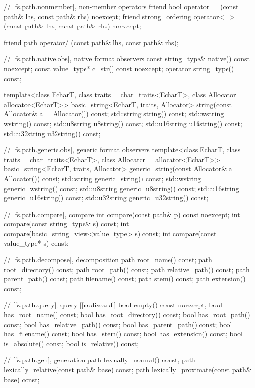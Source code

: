 \begin{codeblock}
{{    // \ref{fs.path.nonmember}, non-member operators
    friend bool operator==(const path& lhs, const path& rhs) noexcept;
    friend strong_ordering operator<=>(const path& lhs, const path& rhs) noexcept;

    friend path operator/ (const path& lhs, const path& rhs);

    // \ref{fs.path.native.obs}, native format observers
    const string_type& native() const noexcept;
    const value_type*  c_str() const noexcept;
    operator string_type() const;

    template<class EcharT, class traits = char_traits<EcharT>,
             class Allocator = allocator<EcharT>>
      basic_string<EcharT, traits, Allocator>
        string(const Allocator& a = Allocator()) const;
    std::string    string() const;
    std::wstring   wstring() const;
    std::u8string  u8string() const;
    std::u16string u16string() const;
    std::u32string u32string() const;

    // \ref{fs.path.generic.obs}, generic format observers
    template<class EcharT, class traits = char_traits<EcharT>,
             class Allocator = allocator<EcharT>>
      basic_string<EcharT, traits, Allocator>
        generic_string(const Allocator& a = Allocator()) const;
    std::string    generic_string() const;
    std::wstring   generic_wstring() const;
    std::u8string  generic_u8string() const;
    std::u16string generic_u16string() const;
    std::u32string generic_u32string() const;

    // \ref{fs.path.compare}, compare
    int compare(const path& p) const noexcept;
    int compare(const string_type& s) const;
    int compare(basic_string_view<value_type> s) const;
    int compare(const value_type* s) const;

    // \ref{fs.path.decompose}, decomposition
    path root_name() const;
    path root_directory() const;
    path root_path() const;
    path relative_path() const;
    path parent_path() const;
    path filename() const;
    path stem() const;
    path extension() const;

    // \ref{fs.path.query}, query
    [[nodiscard]] bool empty() const noexcept;
    bool has_root_name() const;
    bool has_root_directory() const;
    bool has_root_path() const;
    bool has_relative_path() const;
    bool has_parent_path() const;
    bool has_filename() const;
    bool has_stem() const;
    bool has_extension() const;
    bool is_absolute() const;
    bool is_relative() const;

    // \ref{fs.path.gen}, generation
    path lexically_normal() const;
    path lexically_relative(const path& base) const;
    path lexically_proximate(const path& base) const;

}}
\end{codeblock}
